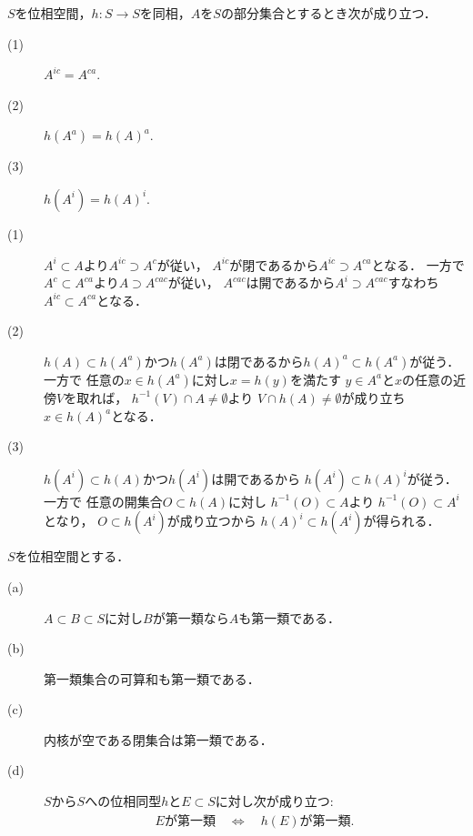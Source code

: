 	\begin{screen}
		\begin{thm}[閉包・内核]\label{thm:topology_note_closure_interior}
			$S$を位相空間，$h:S \longrightarrow S$を同相，$A$を$S$の部分集合とするとき次が成り立つ．
			\begin{description}
				\item[(1)] $A^{ic} = A^{ca}$.
				\item[(2)] $h(A^a) = h(A)^a$.
				\item[(3)] $h(A^i) = h(A)^i$.
			\end{description}
		\end{thm}
	\end{screen}
	
	\begin{prf}\mbox{}
		\begin{description}
			\item[(1)]
				$A^i \subset A$より$A^{ic} \supset A^c$が従い，
				$A^{ic}$が閉であるから$A^{ic} \supset A^{ca}$となる．
				一方で$A^c \subset A^{ca}$より$A \supset A^{cac}$が従い，
				$A^{cac}$は開であるから$A^i \supset A^{cac}$すなわち
				$A^{ic} \subset A^{ca}$となる．
			
			\item[(2)]
				$h(A) \subset h(A^a)$かつ$h(A^a)$は閉であるから$h(A)^a \subset h(A^a)$が従う．一方で
				任意の$x \in h(A^a)$に対し$x = h(y)$を満たす
				$y \in A^a$と$x$の任意の近傍$V$を取れば，
				$h^{-1}(V) \cap A \neq \emptyset$より
				$V \cap h(A) \neq \emptyset$が成り立ち
				$x \in h(A)^a$となる．
				
			\item[(3)]
				$h(A^i) \subset h(A)$かつ$h(A^i)$は開であるから
				$h(A^i) \subset h(A)^i$が従う．一方で
				任意の開集合$O \subset h(A)$に対し
				$h^{-1}(O) \subset A$より
				$h^{-1}(O) \subset A^i$となり，
				$O \subset h(A^i)$が成り立つから
				$h(A)^i \subset h(A^i)$が得られる．
				\QED
		\end{description}
	\end{prf}
	
	\begin{screen}
		\begin{thm}[第一類集合の性質]
			$S$を位相空間とする．
			\begin{description}
				\item[(a)] $A \subset B \subset S$に対し$B$が第一類なら$A$も第一類である．
				\item[(b)] 第一類集合の可算和も第一類である．
				\item[(c)] 内核が空である閉集合は第一類である．
				\item[(d)] $S$から$S$への位相同型$h$と$E \subset S$に対し次が成り立つ:
					\begin{align}
						\mbox{$E$が第一類} \quad \Longleftrightarrow \quad
						\mbox{$h(E)$が第一類}.
					\end{align}
			\end{description}
		\end{thm}
	\end{screen}
	
